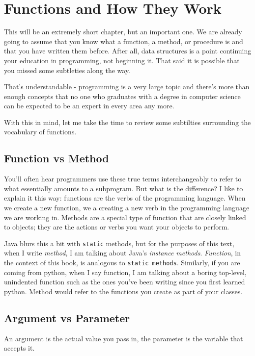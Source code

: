 \chapter{Functions and How They Work}

This will be an extremely short chapter, but an important one.
We are already going to assume that you know what a function, a method, or procedure is and that you have written them before.
After all, data structures is a point continuing your education in programming, not beginning it.
That said it is possible that you missed some subtleties along the way.

That's understandable -  programming is a very large topic and there's more than enough concepts that no one who graduates with a degree in computer science can be expected to be an expert in every area any more.

With this in mind, let me take the time to review some subtilties surrounding the vocabulary of functions.


\section{Function vs Method}

You'll often hear programmers use these true terms interchangeably to refer to what essentially amounts to a subprogram.
But what is the difference?  
I like to explain it this way:  functions are the verbs of the programming language.  When we create a new function, we a creating a new verb in the programming language we are working in.  
Methods are a special type of function that are closely linked to objects;  they are the actions or verbs you want your objects to perform.

Java blurs this a bit with \texttt{static} methods, but for the purposes of this text, when I write \textit{method}, I am talking about Java's \textit{instance methods}. \textit{Function}, in the context of this book, is analogous to \texttt{static methods}. 
Similarly, if you are coming from python, when I say function, I am talking about a boring top-level, unindented function such as the ones you've been writing since you first learned python.  Method would refer to the functions you create as part of your classes.



\section{Argument vs Parameter}
An argument is the actual value you pass in, the parameter is the variable that accepts it.


